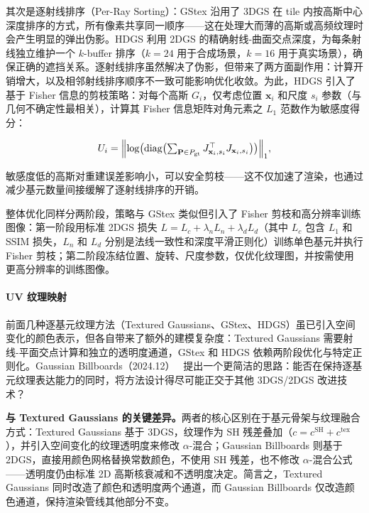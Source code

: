 其次是逐射线排序（Per-Ray Sorting）：GStex 沿用了 3DGS 在 tile 内按高斯中心深度排序的方式，所有像素共享同一顺序——这在处理大而薄的高斯或高频纹理时会产生明显的弹出伪影。HDGS 利用 2DGS 的精确射线-曲面交点深度，为每条射线独立维护一个 $k$-buffer 排序（$k=24$ 用于合成场景，$k=16$ 用于真实场景），确保正确的遮挡关系。逐射线排序虽然解决了伪影，但带来了两方面副作用：计算开销增大，以及相邻射线排序顺序不一致可能影响优化收敛。为此，HDGS 引入了基于 Fisher 信息的剪枝策略：对每个高斯 $G_i$，仅考虑位置 $\mathbf{x}_i$ 和尺度 $s_i$ 参数（与几何不确定性最相关），计算其 Fisher 信息矩阵对角元素之 $L_1$ 范数作为敏感度得分：

\begin{equation}
    U_i = \Bigl\| \log\bigl(\mathrm{diag}\bigl(\textstyle\sum_{\mathbf{P} \in P_{\mathrm{gt}}} J_{\mathbf{x}_i, s_i}^\top J_{\mathbf{x}_i, s_i}\bigr)\bigr) \Bigr\|_1,
\end{equation}

敏感度低的高斯对重建误差影响小，可以安全剪枝——这不仅加速了渲染，也通过减少基元数量间接缓解了逐射线排序的开销。

整体优化同样分两阶段，策略与 GStex 类似但引入了 Fisher 剪枝和高分辨率训练图像：第一阶段用标准 2DGS 损失 $L = L_c + \lambda_n L_n + \lambda_d L_d$（其中 $L_c$ 包含 $L_1$ 和 SSIM 损失，$L_n$ 和 $L_d$ 分别是法线一致性和深度平滑正则化）训练单色基元并执行 Fisher 剪枝；第二阶段冻结位置、旋转、尺度参数，仅优化纹理图，并按需使用更高分辨率的训练图像。

\paragraph{UV 纹理映射}

前面几种逐基元纹理方法（Textured Gaussians、GStex、HDGS）虽已引入空间变化的颜色表示，但各自带来了额外的建模复杂度：Textured Gaussians 需要射线-平面交点计算和独立的透明度通道，GStex 和 HDGS 依赖两阶段优化与特定正则化。Gaussian Billboards（2024.12）~\cite{2412_12734} 提出一个更简洁的思路：能否在保持逐基元纹理表达能力的同时，将方法设计得尽可能正交于其他 3DGS/2DGS 改进技术？

\textbf{与 Textured Gaussians 的关键差异。}两者的核心区别在于基元骨架与纹理融合方式：Textured Gaussians 基于 3DGS，纹理作为 SH 残差叠加（$c = c^{\text{SH}} + c^{\text{tex}}$），并引入空间变化的纹理透明度来修改 $\alpha$-混合；Gaussian Billboards 则基于 2DGS，直接用颜色网格替换常数颜色，不使用 SH 残差，也不修改 $\alpha$-混合公式——透明度仍由标准 2D 高斯核衰减和不透明度决定。简言之，Textured Gaussians 同时改造了颜色和透明度两个通道，而 Gaussian Billboards 仅改造颜色通道，保持渲染管线其他部分不变。

